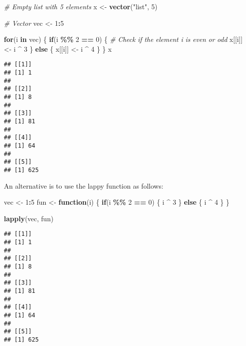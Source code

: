 \documentclass[
]{article}
\newenvironment{Shaded}{\begin{snugshade}}{\end{snugshade}}
\newcommand{\CommentTok}[1]{\textcolor[rgb]{0.56,0.35,0.01}{\textit{#1}}}
\newcommand{\ControlFlowTok}[1]{\textcolor[rgb]{0.13,0.29,0.53}{\textbf{#1}}}
\newcommand{\DecValTok}[1]{\textcolor[rgb]{0.00,0.00,0.81}{#1}}
\newcommand{\FunctionTok}[1]{\textcolor[rgb]{0.13,0.29,0.53}{\textbf{#1}}}
\newcommand{\NormalTok}[1]{#1}
\newcommand{\OtherTok}[1]{\textcolor[rgb]{0.56,0.35,0.01}{#1}}
\newcommand{\SpecialCharTok}[1]{\textcolor[rgb]{0.81,0.36,0.00}{\textbf{#1}}}
\newcommand{\StringTok}[1]{\textcolor[rgb]{0.31,0.60,0.02}{#1}}
\begin{document}
\begin{Shaded}
\begin{Highlighting}[]
\CommentTok{\# Empty list with 5 elements}
\NormalTok{x }\OtherTok{\textless{}{-}} \FunctionTok{vector}\NormalTok{(}\StringTok{"list"}\NormalTok{, }\DecValTok{5}\NormalTok{)}

\CommentTok{\# Vector}
\NormalTok{vec }\OtherTok{\textless{}{-}} \DecValTok{1}\SpecialCharTok{:}\DecValTok{5}

\ControlFlowTok{for}\NormalTok{(i }\ControlFlowTok{in}\NormalTok{ vec) \{}
    \ControlFlowTok{if}\NormalTok{(i }\SpecialCharTok{\%\%} \DecValTok{2} \SpecialCharTok{==} \DecValTok{0}\NormalTok{) \{ }\CommentTok{\# Check if the element \textquotesingle{}i\textquotesingle{} is even or odd}
\NormalTok{        x[[i]] }\OtherTok{\textless{}{-}}\NormalTok{ i }\SpecialCharTok{\^{}} \DecValTok{3}
\NormalTok{    \} }\ControlFlowTok{else}\NormalTok{ \{}
\NormalTok{        x[[i]] }\OtherTok{\textless{}{-}}\NormalTok{ i }\SpecialCharTok{\^{}} \DecValTok{4}
\NormalTok{    \}}
\NormalTok{\}}
\NormalTok{x}
\end{Highlighting}
\end{Shaded}

\begin{verbatim}
## [[1]]
## [1] 1
## 
## [[2]]
## [1] 8
## 
## [[3]]
## [1] 81
## 
## [[4]]
## [1] 64
## 
## [[5]]
## [1] 625
\end{verbatim}

An alternative is to use the lappy function as follows:

\begin{Shaded}
\begin{Highlighting}[]
\NormalTok{vec }\OtherTok{\textless{}{-}} \DecValTok{1}\SpecialCharTok{:}\DecValTok{5}
\NormalTok{fun }\OtherTok{\textless{}{-}} \ControlFlowTok{function}\NormalTok{(i) \{}
   \ControlFlowTok{if}\NormalTok{(i }\SpecialCharTok{\%\%} \DecValTok{2} \SpecialCharTok{==} \DecValTok{0}\NormalTok{) \{}
\NormalTok{        i }\SpecialCharTok{\^{}} \DecValTok{3}
\NormalTok{   \} }\ControlFlowTok{else}\NormalTok{ \{}
\NormalTok{        i }\SpecialCharTok{\^{}} \DecValTok{4}
\NormalTok{    \}}
\NormalTok{\}}

\FunctionTok{lapply}\NormalTok{(vec, fun)}
\end{Highlighting}
\end{Shaded}

\begin{verbatim}
## [[1]]
## [1] 1
## 
## [[2]]
## [1] 8
## 
## [[3]]
## [1] 81
## 
## [[4]]
## [1] 64
## 
## [[5]]
## [1] 625
\end{verbatim}
\end{document}
